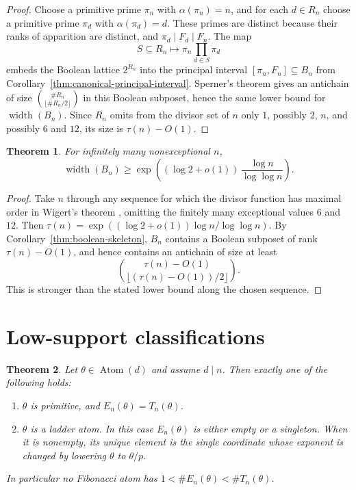 \documentclass[11pt,letterpaper]{article}
\numberwithin{equation}{section}
\theoremstyle{plain}
\newtheorem{theorem}{Theorem}[section]
\theoremstyle{definition}
\theoremstyle{remark}
\DeclareMathOperator{\Atom}{Atom}
\DeclareMathOperator{\widthop}{width}
\begin{document}
\begin{proof}
Choose a primitive prime $\pi_n$ with $\alpha(\pi_n)=n$, and for each
$d\in R_n$ choose a primitive prime $\pi_d$ with $\alpha(\pi_d)=d$. These
primes are distinct because their ranks of apparition are distinct, and
$\pi_d\mid F_d\mid F_n$. The map
\[
S\subseteq R_n\longmapsto \pi_n\prod_{d\in S}\pi_d
\]
embeds the Boolean lattice $2^{R_n}$ into the principal interval
$[\pi_n,F_n]\subseteq B_n$ from
Corollary~\ref{thm:canonical-principal-interval}. Sperner's theorem
\cite{Sperner1928Subsets} gives an antichain of size
$\binom{\#R_n}{\lfloor \#R_n/2\rfloor}$ in this Boolean subposet, hence the
same lower bound for $\widthop(B_n)$. Since $R_n$ omits from the divisor set
of $n$ only $1$, possibly $2$, $n$, and possibly $6$ and $12$, its size is
$\tau(n)-O(1)$.
\end{proof}

\begin{theorem}\label{thm:maximal-order}
For infinitely many nonexceptional $n$,
\[
\widthop(B_n)\ge
\exp\!\left((\log 2+o(1))\,\frac{\log n}{\log\log n}\right).
\]
\end{theorem}

\begin{proof}
Take $n$ through any sequence for which the divisor function has maximal order
in Wigert's theorem \cite{Wigert1907Divisors}, omitting the finitely many
exceptional values $6$ and $12$. Then
$\tau(n)=\exp((\log2+o(1))\log n/\log\log n)$. By
Corollary~\ref{thm:boolean-skeleton}, $B_n$ contains a Boolean subposet of
rank $\tau(n)-O(1)$, and hence contains an antichain of size at least
\[
\binom{\tau(n)-O(1)}{\lfloor(\tau(n)-O(1))/2\rfloor}.
\]
This is stronger than the stated lower bound along the chosen sequence.
\end{proof}

\section{Low-support classifications}\label{sec:low-support}

\begin{theorem}\label{thm:primitive-ladder-dichotomy}
Let $\theta\in\Atom(d)$ and assume $d\mid n$. Then exactly one of the
following holds:
\begin{enumerate}[label=\textup{(\roman*)}]
\item $\theta$ is primitive, and $E_n(\theta)=T_n(\theta)$.
\item $\theta$ is a ladder atom. In this case $E_n(\theta)$ is either empty
or a singleton. When it is nonempty, its unique element is the single
coordinate whose exponent is changed by lowering $\theta$ to $\theta/p$.
\end{enumerate}
In particular no Fibonacci atom has $1<\#E_n(\theta)<\#T_n(\theta)$.
\end{theorem}
\end{document}
